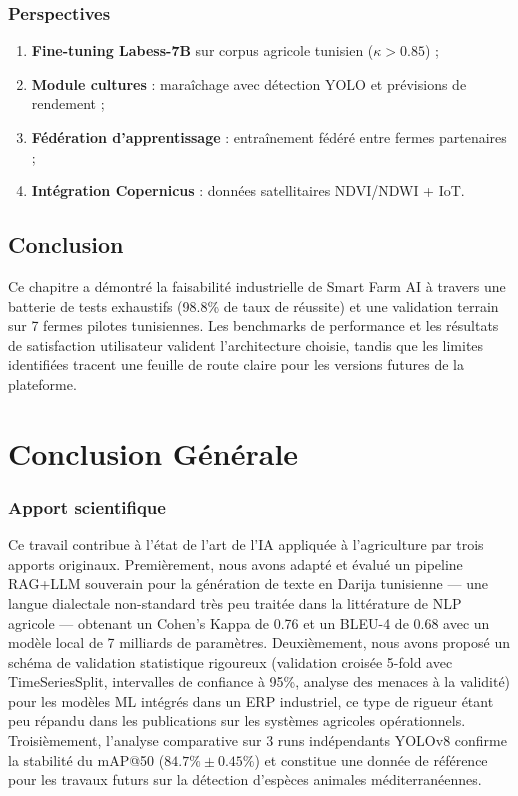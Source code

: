 \subsection{Perspectives}

\begin{enumerate}
  \item \textbf{Fine-tuning Labess-7B} sur corpus agricole tunisien ($\kappa > 0.85$) ;
  \item \textbf{Module cultures} : maraîchage avec détection YOLO et prévisions de rendement ;
  \item \textbf{Fédération d'apprentissage} : entraînement fédéré entre fermes partenaires ;
  \item \textbf{Intégration Copernicus} : données satellitaires NDVI/NDWI + IoT.
\end{enumerate}

\section*{Conclusion}
Ce chapitre a démontré la faisabilité industrielle de Smart Farm AI à travers
une batterie de tests exhaustifs (98.8\% de taux de réussite) et une validation
terrain sur 7 fermes pilotes tunisiennes. Les benchmarks de performance et
les résultats de satisfaction utilisateur valident l'architecture choisie,
tandis que les limites identifiées tracent une feuille de route claire pour
les versions futures de la plateforme.

\chapter*{Conclusion Générale}

\subsection*{Apport scientifique}
Ce travail contribue à l'état de l'art de l'IA appliquée à l'agriculture
par trois apports originaux. Premièrement, nous avons adapté et évalué
un pipeline RAG+LLM souverain pour la génération de texte en Darija
tunisienne — une langue dialectale non-standard très peu traitée dans
la littérature de NLP agricole — obtenant un Cohen's Kappa de 0.76 et
un BLEU-4 de 0.68 avec un modèle local de 7 milliards de paramètres.
Deuxièmement, nous avons proposé un schéma de validation statistique
rigoureux (validation croisée 5-fold avec TimeSeriesSplit, intervalles
de confiance à 95\%, analyse des menaces à la validité) pour les modèles
ML intégrés dans un ERP industriel, ce type de rigueur étant peu répandu
dans les publications sur les systèmes agricoles opérationnels. Troisièmement,
l'analyse comparative sur 3 runs indépendants YOLOv8 confirme la stabilité
du mAP@50 ($84.7\% \pm 0.45\%$) et constitue une donnée de référence pour
les travaux futurs sur la détection d'espèces animales méditerranéennes.

